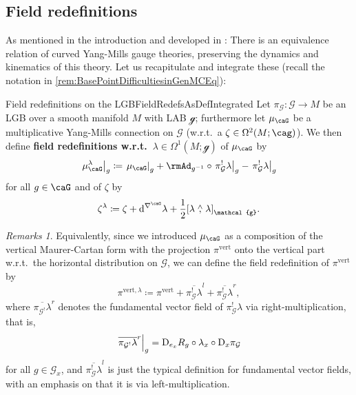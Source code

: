 \documentclass[reqno,a4paper,oneside]{amsart}
\newcommand\mutot{\mu_\caG}
\theoremstyle{plain}
\theoremstyle{remark}
\newtheorem{remark}[theorem]{Remarks}
\theoremstyle{definition}
\begin{document}
\subsection{Field redefinitions}

As mentioned in the introduction and developed in \cite[the latter reference developed the following for Lie algebroids and groupoids as structure]{My1stpaper, MyThesis}: There is an equivalence relation of curved Yang-Mills gauge theories, preserving the dynamics and kinematics of this theory. Let us recapitulate and integrate these {\color{Cred2} (recall the notation in \ref{rem:BasePointDifficultiesinGenMCEq})}:

\begin{definitions}{Field redefinitions on the LGB}{FieldRedefsAsDefIntegrated}
Let $\pi_{\mathcal{G}} \colon \mathcal{G} \to M$ be an LGB over a smooth manifold $M$ with LAB $\mathcal{g}$; furthermore let $\mutot$ be a multiplicative Yang-Mills connection on $\mathcal{G}$ (w.r.t.\ a $\zeta \in \Omega^2(M; \cag)$). We then define \textbf{field redefinitions w.r.t.\ $\lambda \in \Omega^1(M; \mathcal{g})$} of $\mutot$ by
\begin{equation*}
\mleft.\mutot^{\lambda}\mright|_g
\coloneqq
\mleft.\mutot\mright|_g
	+ \rmAd_{g^{-1}} \circ \mleft. \pi_{\mathcal{G}}^!\lambda\mright|_g
	- \mleft.\pi_{\mathcal{G}}^!\lambda\mright|_g
\end{equation*}
for all $g \in \caG$
and of $\zeta$ by
\begin{equation*}
\zeta^\lambda
\coloneqq
\zeta
	+ \mathrm{d}^{\nabla^\caG}\lambda + \frac{1}{2} \mleft[ \lambda \stackrel{\wedge}{,} \lambda \mright]_{\mathcal{g}}.
\end{equation*}
\end{definitions}

\begin{remark}
Equivalently, since we introduced $\mutot$ as a composition of the vertical Maurer-Cartan form with the projection $\pi^{\mathrm{vert}}$ onto the vertical part w.r.t.\ the horizontal distribution on $\mathcal{G}$, we can define the field redefinition of $\pi^{\mathrm{vert}}$ by
\begin{equation*}
\pi^{\mathrm{vert}, \lambda}
\coloneqq
\pi^{\mathrm{vert}}
	+ \overline{\pi_{\mathcal{G}}^! \lambda}^l
	+ \overline{\pi_{\mathcal{G}}^! \lambda}^r,
\end{equation*}
where $\overline{\pi_{\mathcal{G}^!} \lambda}^r$ denotes the fundamental vector field of $\pi_{\mathcal{G}}^! \lambda$ via right-multiplication, that is,
\begin{equation*}
\mleft.\overline{\pi_{\mathcal{G}^!} \lambda}^r\mright|_g
=
\mathrm{D}_{e_x}R_g \circ \lambda_{x} \circ \mathrm{D}_x \pi_{\mathcal{G}}
\end{equation*}
for all $g \in \mathcal{G}_x$, and $\overline{\pi_{\mathcal{G}}^! \lambda}^l$ is just the typical definition for fundamental vector fields, with an emphasis on that it is via left-multiplication. 
\end{remark}
\end{document}

